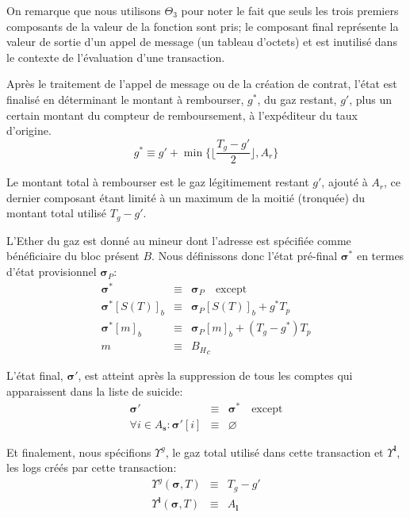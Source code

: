 \documentclass[9pt,oneside]{amsart}
\begin{document}
\begin{multicols}{2}
On remarque que nous utilisons $\Theta_{3}$ pour noter le fait que seuls les trois premiers composants de la valeur de la fonction sont pris; le composant final représente la valeur de sortie d'un appel de message (un tableau d'octets) et est inutilisé dans le contexte de l'évaluation d'une transaction.

Après le traitement de l'appel de message ou de la création de contrat, l'état est finalisé en déterminant le montant à rembourser, $g^*$, du gaz restant, $g'$, plus un certain montant du compteur de remboursement, à l'expéditeur du taux d'origine.
\begin{equation}
g^* \equiv g' + \min \{ \Big\lfloor \dfrac{T_g - g'}{2} \Big\rfloor, A_r \}
\end{equation}

Le montant total à rembourser est le gaz légitimement restant $g'$, ajouté à $A_r$, ce dernier composant étant limité à un maximum de la moitié (tronquée) du montant total utilisé $T_g - g'$.

L'Ether du gaz est donné au mineur dont l'adresse est spécifiée comme bénéficiaire du bloc présent $B$. Nous définissons donc l'état pré-final $\boldsymbol{\sigma}^*$ en termes d'état provisionnel  $\boldsymbol{\sigma}_P$:
\begin{eqnarray}
\boldsymbol{\sigma}^* & \equiv & \boldsymbol{\sigma}_P \quad \text{except} \\
\boldsymbol{\sigma}^*[S(T)]_b & \equiv & \boldsymbol{\sigma}_P[S(T)]_b + g^* T_p \\
\boldsymbol{\sigma}^*[m]_b & \equiv & \boldsymbol{\sigma}_P[m]_b + (T_g - g^*) T_p \\
m & \equiv & {B_H}_c
\end{eqnarray}

L'état final, $\boldsymbol{\sigma}'$, est atteint après la suppression de tous les comptes qui apparaissent dans la liste de suicide:
\begin{eqnarray}
\boldsymbol{\sigma}' & \equiv & \boldsymbol{\sigma}^* \quad \text{except} \\
\forall i \in A_\mathbf{s}: \boldsymbol{\sigma}'[i] & \equiv & \varnothing
\end{eqnarray}

Et finalement, nous spécifions $\Upsilon^g$, le gaz total utilisé dans cette transaction et $\Upsilon^\mathbf{l}$, les logs créés par cette transaction:
\begin{eqnarray}
\Upsilon^g(\boldsymbol{\sigma}, T) & \equiv & T_g - g' \\
\Upsilon^\mathbf{l}(\boldsymbol{\sigma}, T) & \equiv & A_\mathbf{l}
\end{eqnarray}


\end{multicols}
\end{document}
